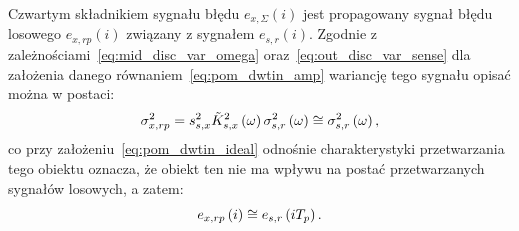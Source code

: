 Czwartym składnikiem sygnału błędu $e_{x,\Sigma}(i)$ jest propagowany sygnał błędu losowego $e_{x,rp}(i)$ związany z sygnałem $e_{s,r}(i)$. Zgodnie z zależnościami~\eqref{eq:mid_disc_var_omega} oraz~\eqref{eq:out_disc_var_sense} dla założenia danego równaniem~\eqref{eq:pom_dwtin_amp} wariancję tego sygnału opisać można w postaci:
\begin{equation}
\sigma_{x,rp}^{2} = s_{s,x}^{2} \tilde{K}_{s,x}^{2} \left(\omega\right) \sigma_{s,r}^{2} \left(\omega\right) \cong \sigma_{s,r}^{2} \left(\omega\right) \label{eq:pom_varx_rand_prop},
\end{equation}
co przy założeniu~\eqref{eq:pom_dwtin_ideal} odnośnie charakterystyki przetwarzania tego obiektu oznacza, że obiekt ten nie ma wpływu na postać przetwarzanych sygnałów losowych, a zatem:
\begin{equation}
e_{x,rp} \left(i\right) \cong e_{s,r} \left(i T_{p}\right) \label{eq:pom_errx_rand_prop}.
\end{equation}

